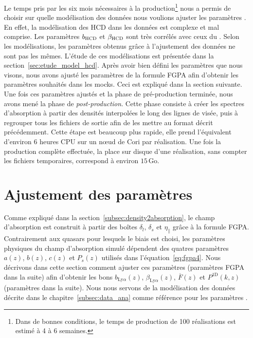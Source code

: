   Le temps pris par les six mois nécessaires à la production\footnote{Dans de bonnes conditions, le temps de production de 100 réalisations est estimé à 4 à 6 semaines.} nous a permis de
  choisir sur quelle modélisation des données nous voulions ajuster les paramètres \lya{}.
  En effet, la modélisation des HCD dans les données est complexe et mal comprise. Les paramètres $b_{\textsc{HCD}}$ et $\beta_{\textsc{HCD}}$ sont très corrélés avec ceux du \lya{}. Selon les modélisations, les paramètres \lya{} obtenus grâce à l'ajustement des données ne sont pas les mêmes. L'étude de ces modélisations est présentée dans la section~\ref{sec:etude_model_hcd}.
Après avoir bien défini les paramètres \lya{} que nous visons, nous avons ajusté les paramètres de la formule FGPA afin d'obtenir les paramètres \lya{} souhaités dans les mocks.
Ceci est expliqué dans la section suivante. Une fois ces paramètres ajustés et la phase de pré-production terminée, nous avons mené la phase de \emph{post-production}. Cette phase consiste à créer les spectres d'absorption à partir des densités interpolées le long des lignes de visée, puis à regrouper tous les fichiers de sortie afin de les mettre au format décrit précédemment. Cette étape est beaucoup plus rapide, elle prend l'équivalent d'environ 6 heures CPU sur un n{\oe}ud de Cori par réalisation. Une fois la production complète effectuée, la place sur disque d'une réalisation, sans compter les fichiers temporaires, correspond à environ $\num{15}\,\mathrm{Go}$.


\section{Ajustement des paramètres}
\label{sec:tuning}
Comme expliqué dans la section~\ref{subsec:density2absorption}, le champ d'absorption \lya{} est construit à partir des boîtes $\delta_l$, $\delta_s$ et $\eta_{\parallel}$ grâce à la formule FGPA.
Contrairement aux quasars pour lesquels le biais est choisi, les paramètres physiques du champ d'absorption \lya{} simulé dépendent des quatres paramètres $a(z)$, $b(z)$, $c(z)$ et $P_{s}(z)$ utilisés dans l'équation~\ref{eq:fgpa4}.
Nous décrivons dans cette section comment ajuster ces paramètres (paramètres FGPA dans la suite) afin d'obtenir les bons $b_{\mathrm{Ly}\alpha}(z)$, $\beta_{\mathrm{Ly}\alpha}(z)$, $\overline F(z)$ et $P^{\mathrm{1D}}(k, z)$ (paramètres \lya{} dans la suite). Nous nous servons de la modélisation des données décrite dans le chapitre~\ref{subsec:data_ana} comme référence pour les paramètres \lya{}.


